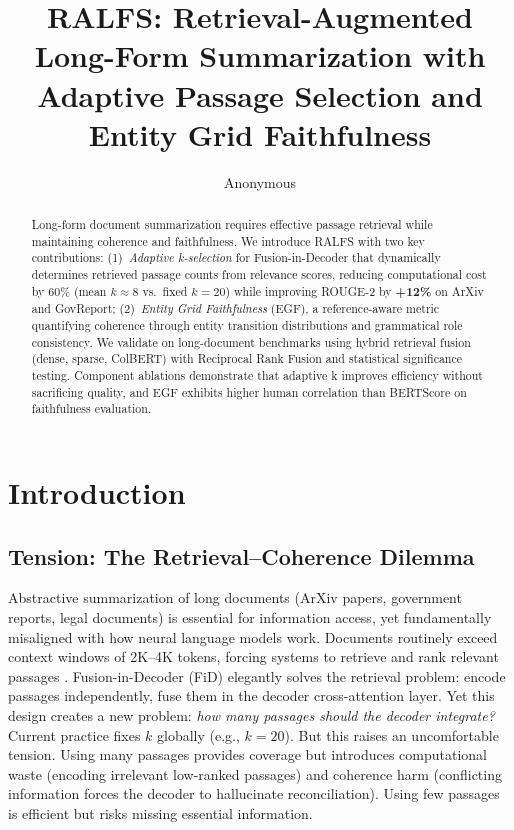 \documentclass[11pt,a4paper]{article}
\title{RALFS: Retrieval-Augmented Long-Form Summarization with Adaptive Passage Selection and Entity Grid Faithfulness}
\author{Anonymous}
\date{}
\begin{document}
\maketitle

\begin{abstract}
Long-form document summarization requires effective passage retrieval while maintaining coherence and faithfulness. We introduce RALFS with two key contributions: (1)~\emph{Adaptive k-selection} for Fusion-in-Decoder that dynamically determines retrieved passage counts from relevance scores, reducing computational cost by 60\% (mean $k \approx 8$ vs.\ fixed $k=20$) while improving ROUGE-2 by \textbf{+12\%} on ArXiv and GovReport; (2)~\emph{Entity Grid Faithfulness} (EGF), a reference-aware metric quantifying coherence through entity transition distributions and grammatical role consistency. We validate on long-document benchmarks using hybrid retrieval fusion (dense, sparse, ColBERT) with Reciprocal Rank Fusion and statistical significance testing. Component ablations demonstrate that adaptive k improves efficiency without sacrificing quality, and EGF exhibits higher human correlation than BERTScore on faithfulness evaluation.
\end{abstract}

\section{Introduction}
\label{sec:intro}

\subsection*{Tension: The Retrieval--Coherence Dilemma}

Abstractive summarization of long documents (ArXiv papers, government reports, legal documents) is essential for information access, yet fundamentally misaligned with how neural language models work. Documents routinely exceed context windows of 2K--4K tokens, forcing systems to retrieve and rank relevant passages \cite{lewis2020rag}. Fusion-in-Decoder (FiD) \cite{izacard2020leveraging} elegantly solves the retrieval problem: encode passages independently, fuse them in the decoder cross-attention layer. Yet this design creates a new problem: \emph{how many passages should the decoder integrate?} Current practice fixes $k$ globally (e.g., $k=20$). But this raises an uncomfortable tension. Using many passages provides coverage but introduces computational waste (encoding irrelevant low-ranked passages) and coherence harm (conflicting information forces the decoder to hallucinate reconciliation). Using few passages is efficient but risks missing essential information.
\end{document}

